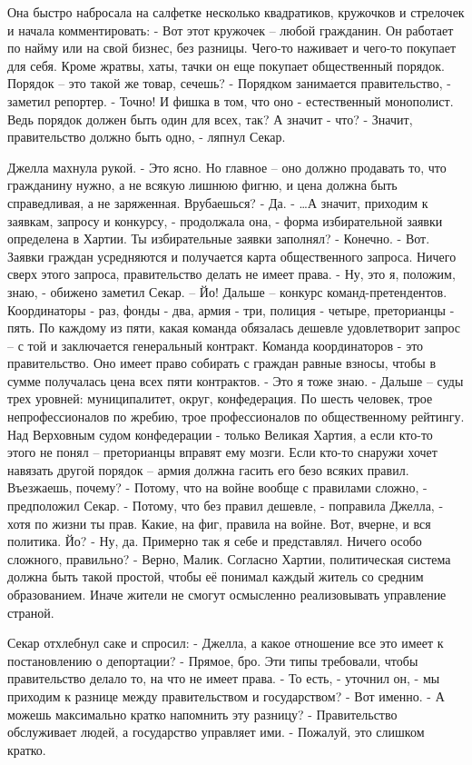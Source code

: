\documentclass[10pt,final]{book}
\begin{document}
Она быстро набросала на салфетке несколько квадратиков, кружочков и стрелочек и начала комментировать:
- Вот этот кружочек -- любой гражданин. Он работает по найму или на свой бизнес, без разницы. Чего-то наживает и чего-то покупает для себя. Кроме жратвы, хаты, тачки он еще покупает общественный порядок. Порядок -- это такой же товар, сечешь?
- Порядком занимается правительство, - заметил репортер.
- Точно! И фишка в том, что оно - естественный монополист. Ведь порядок должен быть один для всех, так? А значит - что?
- Значит, правительство должно быть одно, - ляпнул Секар.

Джелла махнула рукой.
- Это ясно. Но главное -- оно должно продавать то, что гражданину нужно, а не всякую лишнюю фигню, и цена должна быть справедливая, а не заряженная. Врубаешься?
- Да.
- \ldots{}А значит, приходим к заявкам, запросу и конкурсу, - продолжала она, - форма избирательной заявки определена в Хартии. Ты избирательные заявки заполнял?
- Конечно.
- Вот. Заявки граждан усредняются и получается карта общественного запроса. Ничего сверх этого запроса, правительство делать не имеет права.
- Ну, это я, положим, знаю, - обижено заметил Секар.
-- Йо! Дальше -- конкурс команд-претендентов. Координаторы - раз, фонды - два, армия - три, полиция - четыре, преторианцы - пять. По каждому из пяти, какая команда обязалась дешевле удовлетворит запрос -- с той и заключается генеральный контракт. Команда координаторов - это правительство. Оно имеет право собирать с граждан равные взносы, чтобы в сумме получалась цена всех пяти контрактов.
- Это я тоже знаю.
- Дальше -- суды трех уровней: муниципалитет, округ, конфедерация. По шесть человек, трое непрофессионалов по жребию, трое профессионалов по общественному рейтингу. Над Верховным судом конфедерации - только Великая Хартия, а если кто-то этого не понял -- преторианцы вправят ему мозги. Если кто-то снаружи хочет навязать другой порядок -- армия должна гасить его безо всяких правил. Въезжаешь, почему?
- Потому, что на войне вообще с правилами сложно, - предположил Секар.
- Потому, что без правил дешевле, - поправила Джелла, - хотя по жизни ты прав. Какие, на фиг, правила на войне. Вот, вчерне, и вся политика. Йо?
- Ну, да. Примерно так я себе и представлял. Ничего особо сложного, правильно?
- Верно, Малик. Согласно Хартии, политическая система должна быть такой простой, чтобы её понимал каждый житель со средним образованием. Иначе жители не смогут осмысленно реализовывать управление страной.

Секар отхлебнул саке и спросил:
- Джелла, а какое отношение все это имеет к постановлению о депортации?
- Прямое, бро. Эти типы требовали, чтобы правительство делало то, на что не имеет права.
- То есть, - уточнил он, - мы приходим к разнице между правительством и государством?
- Вот именно.
- А можешь максимально кратко напомнить эту разницу?
- Правительство обслуживает людей, а государство управляет ими.
- Пожалуй, это слишком кратко.
\end{document}
